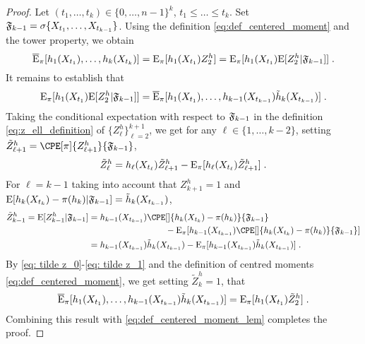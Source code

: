 \begin{proof}
  Let $(t_1,\dots,t_{k}) \in \{0,\ldots,n-1\}^{k}$, $t_1 \leq \dots\leq t_{k}$.
Set $\mathfrak{F}_{k-1} = \sigma\{X_{t_1}, \ldots, X_{t_{k-1}}\}$. Using the definition \eqref{eq:def_centered_moment} and the tower property, we obtain
\begin{equation}
  \label{eq:def_centered_moment_lem}
     \overline{\mathrm{E}}_{\pi}[h_1(X_{t_1}), \ldots, h_{k}(X_{t_{k}}) ] = \mathrm{E}_\pi[h_1(X_{t_1}) Z^h_{2}] =\mathrm{E}_\pi[h_1(X_{t_1}) \mathrm{E}[Z^h_{2}|\mathfrak{F}_{k-1}]] \;.
\end{equation}
It remains to establish that 
\[
\mathrm{E}_\pi[h_1(X_{t_1}) \mathrm{E}[Z^h_{2}|\mathfrak{F}_{k-1}]] = \overline{\mathrm{E}}_\pi[h_1(X_{t_1}), \ldots , h_{k-1}(X_{t_{k-1}}) \tilde h_{k}(X_{t_{k-1}})]\;.
\]
Taking the conditional expectation with respect to $\mathfrak{F}_{k-1}$ in the definition \eqref{eq:z_ell_definition}  %
of $\{Z^h_{\ell}\}_{\ell=2}^{k+1}$, we get for any $\ell \in \{1, \ldots, k-2\}$,
 setting  $\tilde Z^h_{\ell+1} = \CPE[\pi]{Z^h_{\ell+1}}{\mathfrak F_{k-1}}$,
\begin{equation}
\label{eq: tilde z_0}
    \tilde Z^h_\ell  = h_\ell(X_{t_\ell}) \tilde Z^h_{\ell+1} - \mathrm{E}_\pi[ h_\ell(X_{t_\ell}) \tilde Z^h_{\ell+1}] \;.
\end{equation}
For $\ell = k-1$ taking into account that $Z^h_{k+1} = 1$ and $\mathrm{E}[h_{k}(X_{t_{k}}) - \pi(h_k) | \mathfrak F_{k-1}] = \tilde h_k(X_{t_{k-1}})$,
\begin{align}
\nonumber
\tilde Z^h_{k-1} = \PE[Z^h_{k-1}|\mff_{k-1}] &= h_{k-1}(X_{t_{k-1}}) \CPE[]{h_{k}(X_{t_{k}}) - \pi(h_k)}{\mathfrak F_{k-1}} \\
\nonumber
& \phantom{h_{k-1}(X_{t_{k-1}}) xxxxxx}
- \PE_\pi[ h_{k-1}(X_{t_{k-1}}) \CPE[]{h_{k}(X_{t_{k}}) - \pi(h_k)}{\mathfrak F_{k-1}}] \\
& = h_{k-1}(X_{t_{k-1}}) \tilde h_{k}(X_{t_{k-1}})  - \PE_\pi[ h_{k-1}(X_{t_{k-1}}) \tilde h_{k}(X_{t_{k-1}})]
\label{eq: tilde z_1}
\eqsp.
\end{align}
By \eqref{eq: tilde z_0}-\eqref{eq: tilde z_1} and the definition of centred moments \eqref{eq:def_centered_moment}, we get setting $\tilde{Z}^h_k=1$, that
\begin{equation*}
\overline{\mathrm{E}}_\pi[h_1(X_{t_1}), \ldots , h_{k-1}(X_{t_{k-1}}) \tilde h_{k}(X_{t_{k-1}})] = \mathrm{E}_\pi[h_1(X_{t_1}) \tilde Z^h_{2}] \;.
\end{equation*}
Combining this result with \eqref{eq:def_centered_moment_lem} completes the proof. %
\end{proof}

